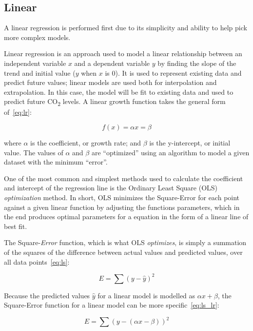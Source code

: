 \documentclass{mcmthesis}
\begin{document}
    \subsection{Linear}
    A linear regression is performed first due to its simplicity and ability to help pick more complex models.

    Linear regression is an approach used to model a linear relationship between an independent variable $x$ and a dependent variable $y$ by finding the slope of the trend and initial value ($y$ when $x$ is 0).
    It is used to represent existing data and predict future values; linear models are used both for interpolation and extrapolation. In this case, the model will be fit to existing data and used to predict future CO\textsubscript{2} levels.
    A linear growth function takes the general form of~\eqref{eq:lr}:

    \begin{equation}
        f(x) = \alpha x = \beta
        \label{eq:lr}
    \end{equation}

    \noindent where $\alpha$ is the coefficient, or growth rate; and $\beta$ is the y-intercept, or initial value.
    The values of $\alpha$ and $\beta$ are ``optimized'' using an algorithm to model a given dataset with the minimum ``error''.

    One of the most common and simplest methods used to calculate the coefficient and intercept of the regression line is the Ordinary Least Square (OLS) \textit{optimization} method.
    In short, OLS minimizes the Square-Error for each point against a given linear function by adjusting the function\textquotesingle s parameters, which in the end produces optimal parameters for a equation in the form of a linear line of best fit.

    The Square-\textit{Error} function, which is what OLS \textit{optimizes}, is simply a summation of the squares of the difference between actual values and predicted values, over all data points~\eqref{eq:ls}:

    \begin{equation}
        E = \sum{(y - \hat{y})^2}
        \label{eq:ls}
    \end{equation}

    Because the predicted values $\hat{y}$ for a linear model is modelled as $\alpha x + \beta$, the Square-Error function for a linear model can be more specific~\eqref{eq:ls_lr}:

    \begin{equation}
        E = \sum{(y - (\alpha x - \beta))^2}
        \label{eq:ls_lr}
    \end{equation}
\end{document}
